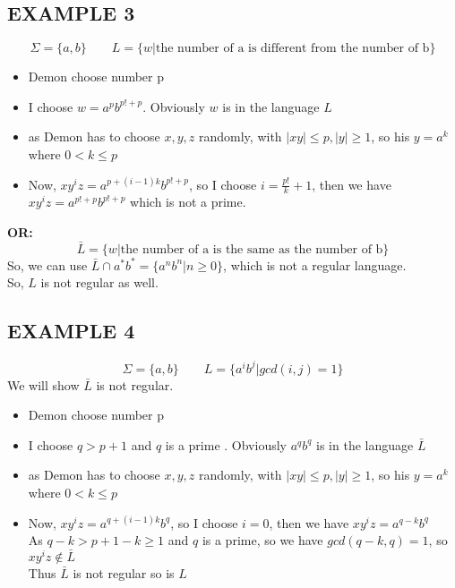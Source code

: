 \documentclass [9 pt]{article}
\theoremstyle{definition}
\begin{document}
\subsection*{EXAMPLE 3}

$$\Sigma = \{a, b\} \quad \quad L = \{ w |\text{the number of a is different from the number of b}  \}$$
\begin{itemize}
	\item Demon choose number p
	\item I choose $w = a^p b^{p! + p}$. Obviously $w$ is  in the language $L$
	\item as Demon has to choose $ x, y, z $ randomly, with $|x y| \leq p, |y| \geq 1 $, so his $y = a^k $ where $0 < k \leq p $ 
	\item Now, $xy^iz = a^{p + (i-1)k}b^{p! + p}$, so I choose $i = \frac{p!}{k}+ 1 $, then we have $xy^iz = a^{p! + p} b^{p! + p} $ which is not a prime.\\
\end{itemize}
\textbf{OR:}
$$\bar{L} = \{ w |\text{the number of a is the same as the number of b}  \}$$
So, we can use $\bar{L} \cap a^*b^* = \{a^n b^n | n \geq 0 \} $, which is not a regular language.\\
So, $L$ is not regular as well.

\subsection*{EXAMPLE 4}
$$\Sigma = \{a, b\} \quad \quad L = \{ a^i b^j | gcd(i, j) = 1  \}$$
We will show $\bar{L}$ is not regular.
\begin{itemize}
	\item Demon choose number p
	\item I choose $q > p+1$ and $q$ is a prime . Obviously $a^q b^q$ is  in the language $\bar{L}$
	\item as Demon has to choose $ x, y, z $ randomly, with $|x y| \leq p, |y| \geq 1 $, so his $y = a^k $ where $0 < k \leq p $ 
	\item Now, $xy^iz = a^{q + (i-1)k}b^{q}$, so I choose $i = 0 $, then we have $xy^iz = a^{q-k} b^{q} $ \\
	As $q - k > p + 1 - k \geq 1$ and $q$ is a prime, so we have $gcd(q-k, q) = 1$, so $ xy^iz \notin \bar{L} $\\
	Thus $\bar{L}$ is not regular so is $L$
\end{itemize}
\end{document}
